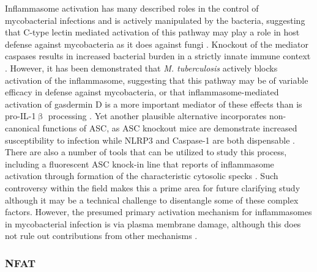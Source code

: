 Inflammasome activation has many described roles in the control of mycobacterial infections and is actively manipulated by the bacteria, suggesting that C\hyp{}type lectin mediated activation of this pathway may play a role in host defense against mycobacteria as it does against fungi \citep{Hardison2012, Wassermann2015}. Knockout of the mediator caspases results in increased bacterial burden in a strictly innate immune context \citep{Kenyon2017}. However, it has been demonstrated that \textit{M. tuberculosis} actively blocks activation of the inflammasome, suggesting that this pathway may be of variable efficacy in defense against mycobacteria, or that inflammasome\hyp{}mediated activation of gasdermin D is a more important mediator of these effects than is pro\hyp{}IL\hyp{}1$\upbeta$ processing \citep{Master2008, Qu2020}. Yet another plausible alternative incorporates non\hyp{}canonical functions of ASC, as ASC knockout mice are demonstrate increased susceptibility to infection while NLRP3 and Caspase\hyp{}1 are both dispensable \citep{McElvaniaTekippe2010}. There are also a number of tools that can be utilized to study this process, including a fluorescent ASC knock\hyp{}in line that reports of inflammasome activation through formation of the characteristic cytosolic specks \citep{Kuri2017}. Such controversy within the field makes this a prime area for future clarifying study although it may be a technical challenge to disentangle some of these complex factors. However, the presumed primary activation mechanism for inflammasomes in mycobacterial infection is via plasma membrane damage, although this does not rule out contributions from other mechanisms \citep{Beckwith2020}.

\subsubsection{NFAT}\label{clr:nfat}

